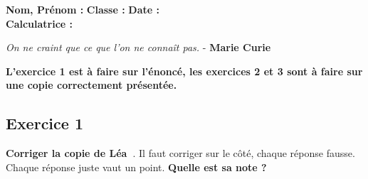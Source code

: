 \documentclass[12pt]{article}
\begin{document}

\textbf{Nom, Prénom :} \hspace{8cm} \textbf{Classe :} \hspace{3cm} \textbf{Date :}\\
\textbf{Calculatrice :}

\begin{center}
  \textit{On ne craint que ce que l'on ne connaît pas.}  - \textbf{Marie Curie}
\end{center}


\textbf{L'exercice 1 est à faire sur l'énoncé, les exercices 2 et 3 sont à faire sur une copie correctement présentée.}

\subsection*{Exercice 1} 

\textbf{Corriger la copie de Léa }. Il faut corriger sur le côté, chaque réponse fausse. Chaque réponse juste vaut un point. \textbf{Quelle est sa note ?}
\end{document}
